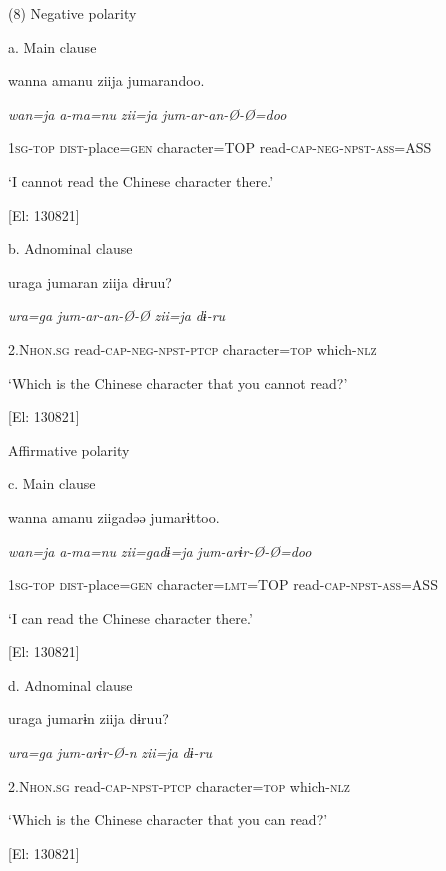 (8)  Negative polarity

  a.  Main clause

    wanna  amanu  ziija  jumarandoo.

    \textit{wan=ja}  \textit{a-ma=nu}  \textit{zii=ja}  \textit{jum-ar-an-Ø-Ø=doo}

    1\textsc{sg}-\textsc{top}  \textsc{dist}-place=\textsc{gen}  character=TOP  read-\textsc{cap}-\textsc{neg}-\textsc{npst}-\textsc{ass}=ASS

    ‘I cannot read the Chinese character there.’

    [El: 130821]

  b.  Adnominal clause

    uraga  jumaran  ziija  dɨruu?

    \textit{ura=ga}  \textit{jum-ar-an-Ø-Ø}  \textit{zii=ja}  \textit{dɨ-ru}

    2.N\textsc{hon}.\textsc{sg}  read-\textsc{cap}-\textsc{neg}-\textsc{npst}-\textsc{ptcp}  character=\textsc{top}  which-\textsc{nlz}

    ‘Which is the Chinese character that you cannot read?’

    [El: 130821]

  Affirmative polarity

  c.  Main clause

    wanna  amanu  ziigadəə  jumarɨttoo.

    \textit{wan=ja}  \textit{a-ma=nu}  \textit{zii=gadɨ=ja}  \textit{jum-arɨr-Ø-Ø=doo}

    1\textsc{sg}-\textsc{top}  \textsc{dist}-place=\textsc{gen}  character=\textsc{lmt}=TOP  read-\textsc{cap}-\textsc{npst}-\textsc{ass}=ASS

    ‘I can read the Chinese character there.’

    [El: 130821]

  d.  Adnominal clause

    uraga  jumarɨn  ziija  dɨruu?

    \textit{ura=ga}  \textit{jum-arɨr-Ø-n}  \textit{zii=ja}  \textit{dɨ-ru}

    2.N\textsc{hon}.\textsc{sg}  read-\textsc{cap}-\textsc{npst}-\textsc{ptcp}  character=\textsc{top}  which-\textsc{nlz}

    ‘Which is the Chinese character that you can read?’

    [El: 130821]

